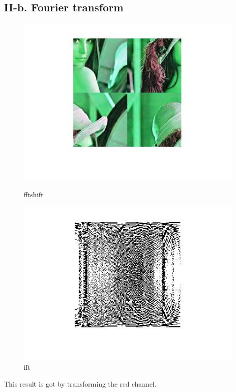 \documentclass[twoside,a4paper]{article}
\begin{document}
\subsection*{II-b. Fourier transform}
\begin{figure}[H]
\centering
\includegraphics[width=5in]{fft.jpg}
\caption{fftshift}
\includegraphics[width=5in]{realfft.jpg}
\caption{fft}
\end{figure}
This result is got by transforming the red channel.
\end{document}

